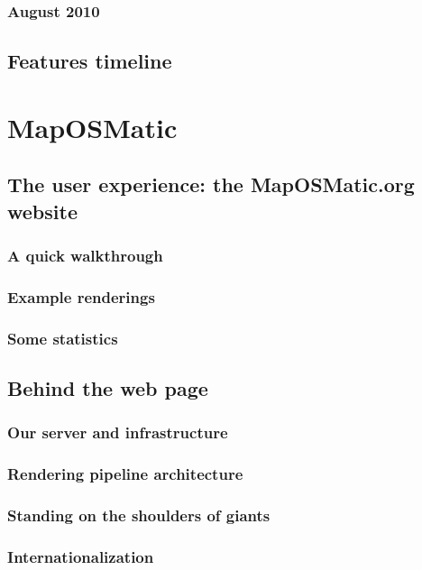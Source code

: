\documentclass{beamer}
\begin{document}
\subsubsection{August 2010}

\subsection{Features timeline}

\section{MapOSMatic}
\subsection{The user experience: the MapOSMatic.org website}
\subsubsection{A quick walkthrough}
\subsubsection{Example renderings}
\subsubsection{Some statistics}

\subsection{Behind the web page}
\subsubsection{Our server and infrastructure}
\subsubsection{Rendering pipeline architecture}
\subsubsection{Standing on the shoulders of giants}
\subsubsection{Internationalization}
\end{document}
